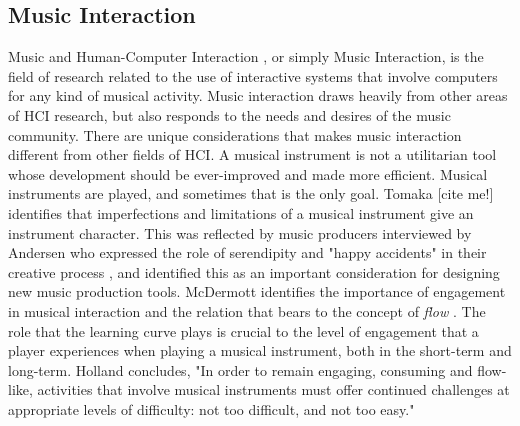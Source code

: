 \subsection{Music Interaction}
Music and Human-Computer Interaction \cite{holland2013music}, or simply Music Interaction, is the field of research related to the use of interactive systems that involve computers for any kind of musical activity. Music interaction draws heavily from other areas of HCI research, but also responds to the needs and desires of the music community. There are unique considerations that makes music interaction different from other fields of HCI. A musical instrument is not a utilitarian tool whose development should be ever-improved and made more efficient. Musical instruments are played, and sometimes that is the only goal. Tomaka [cite me!] identifies that imperfections and limitations of a musical instrument give an instrument character. This was reflected by music producers interviewed by Andersen who expressed the role of serendipity and "happy accidents" in their creative process \cite{andersen2016conversations}, and identified this as an important consideration for designing new music production tools. McDermott \cite{mcdermott2013should} identifies the importance of engagement in musical interaction and the relation that bears to the concept of \textit{flow} \cite{csikszentmihalyi1990flow}. The role that the learning curve plays is crucial to the level of engagement that a player experiences when playing a musical instrument, both in the short-term and long-term. Holland \cite{holland2013music} concludes, "In order to remain engaging, consuming and flow-like, activities that involve musical instruments must offer continued challenges at appropriate levels of difficulty: not too difficult, and not too easy." 

